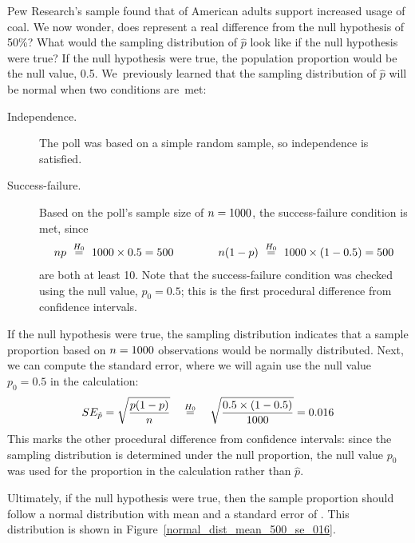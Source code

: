 \begin{examplewrap}
\begin{nexample}{Pew Research's sample found that
    \pewcoalpollpercent{}
    of American adults support increased usage of coal.
    We now wonder, does \pewcoalpollpercent{} represent
    a real difference from the null hypothesis of 50\%?
    What would the sampling distribution of $\hat{p}$
    look like if the null hypothesis were true?}
  If the null hypothesis were true, the population proportion
  would be the null value, 0.5.
  We~previously learned that
  the sampling distribution of $\hat{p}$ will be normal when
  two conditions are~met:
  \begin{description}
    \item[Independence.]
        The poll was based on a simple random sample,
        so independence is satisfied.
    \item[Success-failure.]
        Based on the poll's sample size of
        $n = 1000{}$,
        the success-failure condition is met, since
        \begin{align*}
        np ~ \stackrel{H_0}{=}
            ~ 1000{} \times 0.5{}
            = 500
        \qquad\qquad
        n (1 - p) ~ \stackrel{H_0}{=}
            ~ 1000{} \times
                (1 - 0.5{})
            = 500
        \end{align*}
        are both at least 10.
        Note that the success-failure condition was checked
        using the null value, $p_0 = 0.5$;
        this is the first procedural difference from
        confidence intervals.
  \end{description}
  If the null hypothesis were true, the sampling distribution
  indicates that a sample proportion based on
  $n = 1000{}$ observations
  would be normally distributed. Next, we can compute the standard
  error, where we will again use the null value $p_0 = 0.5$ in the
  calculation:
  \begin{align*}
  SE_{\hat{p}}
    = \sqrt{\frac{p (1 - p)}{n}}
    \quad \stackrel{H_0}{=} \quad
        \sqrt{\frac{0.5{} \times
            (1 - 0.5{})}{1000{}}}
    = 0.016{}
  \end{align*}
  This marks the other procedural difference from confidence
  intervals: since the sampling distribution is determined
  under the null proportion, the null value $p_0$ was used for
  the proportion in the calculation rather than $\hat{p}$.

  Ultimately, if the null hypothesis were true, then the sample
  proportion should follow a normal distribution with mean
  \pewcoalpollnullvalue{}
  and a standard error of \pewcoalpollnullse{}.
  This distribution is shown in
  Figure~\ref{normal_dist_mean_500_se_016}.
\end{nexample}
\end{examplewrap}

